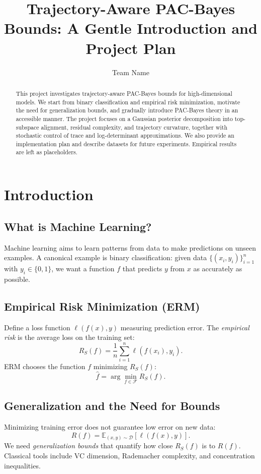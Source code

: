 \documentclass[11pt]{article}
\title{Trajectory-Aware PAC-Bayes Bounds: A Gentle Introduction and Project Plan}
\author{Team Name}
\date{}
\begin{document}
\maketitle

\begin{abstract}
This project investigates trajectory-aware PAC-Bayes bounds for high-dimensional models. 
We start from binary classification and empirical risk minimization, motivate the need for generalization bounds, and gradually introduce PAC-Bayes theory in an accessible manner. 
The project focuses on a Gaussian posterior decomposition into top-subspace alignment, residual complexity, and trajectory curvature, together with stochastic control of trace and log-determinant approximations. 
We also provide an implementation plan and describe datasets for future experiments. 
Empirical results are left as placeholders.
\end{abstract}

\section{Introduction}
\subsection{What is Machine Learning?}
Machine learning aims to learn patterns from data to make predictions on unseen examples. 
A canonical example is binary classification: given data $\{(x_i,y_i)\}_{i=1}^n$ with $y_i \in \{0,1\}$, we want a function $f$ that predicts $y$ from $x$ as accurately as possible.

\subsection{Empirical Risk Minimization (ERM)}
Define a loss function $\ell(f(x),y)$ measuring prediction error. 
The \emph{empirical risk} is the average loss on the training set:
\[
R_S(f) = \frac{1}{n}\sum_{i=1}^n \ell(f(x_i),y_i).
\]
ERM chooses the function $f$ minimizing $R_S(f)$:
\[
\hat f = \arg\min_{f\in \mathcal{F}} R_S(f).
\]

\subsection{Generalization and the Need for Bounds}
Minimizing training error does not guarantee low error on new data:
\[
R(f) = \mathbb{E}_{(x,y)\sim \mathcal{D}}[\ell(f(x),y)].
\]
We need \emph{generalization bounds} that quantify how close $R_S(f)$ is to $R(f)$. 
Classical tools include VC dimension, Rademacher complexity, and concentration inequalities.
\end{document}
